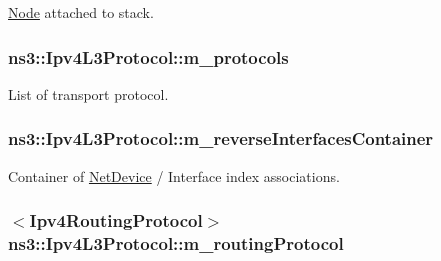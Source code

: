 \hyperlink{classns3_1_1Node}{Node} attached to stack. 

\subsubsection[{\texorpdfstring{m\+\_\+protocols}{m_protocols}}]{ ns3\+::\+Ipv4\+L3\+Protocol\+::m\+\_\+protocols\hspace{0.3cm}{\ttfamily [private]}}\hypertarget{classns3_1_1Ipv4L3Protocol_ab1c0a7a1a453db3c2ca3e47d7e65ff54}{}\label{classns3_1_1Ipv4L3Protocol_ab1c0a7a1a453db3c2ca3e47d7e65ff54}


List of transport protocol. 

\subsubsection[{\texorpdfstring{m\+\_\+reverse\+Interfaces\+Container}{m_reverseInterfacesContainer}}]{ ns3\+::\+Ipv4\+L3\+Protocol\+::m\+\_\+reverse\+Interfaces\+Container\hspace{0.3cm}{\ttfamily [private]}}\hypertarget{classns3_1_1Ipv4L3Protocol_aa222dd0d50b6a835033b4cec1d63c096}{}\label{classns3_1_1Ipv4L3Protocol_aa222dd0d50b6a835033b4cec1d63c096}


Container of \hyperlink{classns3_1_1NetDevice}{Net\+Device} / Interface index associations. 

\subsubsection[{\texorpdfstring{m\+\_\+routing\+Protocol}{m_routingProtocol}}]{$<${\bf Ipv4\+Routing\+Protocol}$>$ ns3\+::\+Ipv4\+L3\+Protocol\+::m\+\_\+routing\+Protocol\hspace{0.3cm}{\ttfamily [private]}}\hypertarget{classns3_1_1Ipv4L3Protocol_abc52052cbf9c4104be407221397c7a55}{}\label{classns3_1_1Ipv4L3Protocol_abc52052cbf9c4104be407221397c7a55}


